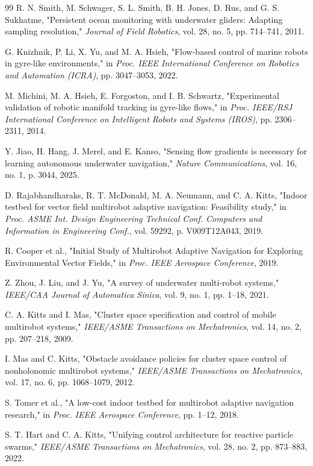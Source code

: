 \documentclass[lettersize,journal]{IEEEtran}
\begin{document}
\begin{thebibliography}{99}
 R. N. Smith, M. Schwager, S. L. Smith, B. H. Jones, D. Rus, and G. S. Sukhatme, "Persistent ocean monitoring with underwater gliders: Adapting sampling resolution," \textit{Journal of Field Robotics}, vol. 28, no. 5, pp. 714--741, 2011.

 G. Knizhnik, P. Li, X. Yu, and M. A. Hsieh, "Flow-based control of marine robots in gyre-like environments," in \textit{Proc. IEEE International Conference on Robotics and Automation (ICRA)}, pp. 3047--3053, 2022.

 M. Michini, M. A. Hsieh, E. Forgoston, and I. B. Schwartz, "Experimental validation of robotic manifold tracking in gyre-like flows," in \textit{Proc. IEEE/RSJ International Conference on Intelligent Robots and Systems (IROS)}, pp. 2306--2311, 2014.

 Y. Jiao, H. Hang, J. Merel, and E. Kanso, "Sensing flow gradients is necessary for learning autonomous underwater navigation," \textit{Nature Communications}, vol. 16, no. 1, p. 3044, 2025.

 D. Rajabhandharaks, R. T. McDonald, M. A. Neumann, and C. A. Kitts, "Indoor testbed for vector field multirobot adaptive navigation: Feasibility study," in \textit{Proc. ASME Int. Design Engineering Technical Conf. Computers and Information in Engineering Conf.}, vol. 59292, p. V009T12A043, 2019.

 R. Cooper et al., "Initial Study of Multirobot Adaptive Navigation for Exploring Environmental Vector Fields," in \textit{Proc. IEEE Aerospace Conference}, 2019.

 Z. Zhou, J. Liu, and J. Yu, "A survey of underwater multi-robot systems," \textit{IEEE/CAA Journal of Automatica Sinica}, vol. 9, no. 1, pp. 1--18, 2021.

 C. A. Kitts and I. Mas, "Cluster space specification and control of mobile multirobot systems," \textit{IEEE/ASME Transactions on Mechatronics}, vol. 14, no. 2, pp. 207--218, 2009.

 I. Mas and C. Kitts, "Obstacle avoidance policies for cluster space control of nonholonomic multirobot systems," \textit{IEEE/ASME Transactions on Mechatronics}, vol. 17, no. 6, pp. 1068--1079, 2012.

 S. Tomer et al., "A low-cost indoor testbed for multirobot adaptive navigation research," in \textit{Proc. IEEE Aerospace Conference}, pp. 1--12, 2018.

 S. T. Hart and C. A. Kitts, "Unifying control architecture for reactive particle swarms," \textit{IEEE/ASME Transactions on Mechatronics}, vol. 28, no. 2, pp. 873--883, 2022.


\end{thebibliography}
\end{document}
